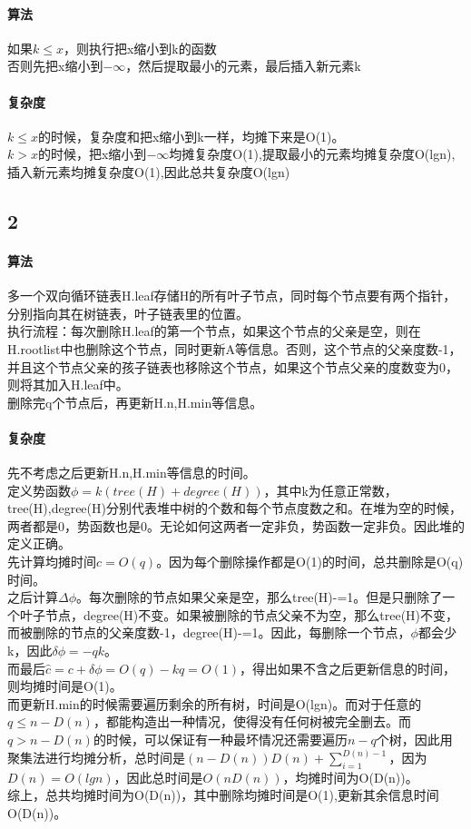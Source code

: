 \documentclass{article}
\begin{document}
\begin{CJK}{UTF8}{gkai}
\paragraph{算法}
如果$k\leq x$，则执行把x缩小到k的函数\\
否则先把x缩小到$-\infty$，然后提取最小的元素，最后插入新元素k\\
\paragraph{复杂度}
$k \leq x$的时候，复杂度和把x缩小到k一样，均摊下来是O(1)。\\
$k > x$的时候，把x缩小到$-\infty$均摊复杂度O(1),提取最小的元素均摊复杂度O(lgn),插入新元素均摊复杂度O(1),因此总共复杂度O(lgn)\\
\subsection{2}
\paragraph{算法}
多一个双向循环链表H.leaf存储H的所有叶子节点，同时每个节点要有两个指针，分别指向其在树链表，叶子链表里的位置。\\
执行流程：每次删除H.leaf的第一个节点，如果这个节点的父亲是空，则在H.rootlist中也删除这个节点，同时更新A等信息。否则，这个节点的父亲度数-1，并且这个节点父亲的孩子链表也移除这个节点，如果这个节点父亲的度数变为0，则将其加入H.leaf中。\\
删除完q个节点后，再更新H.n,H.min等信息。\\
\paragraph{复杂度}
先不考虑之后更新H.n,H.min等信息的时间。\\
定义势函数$\phi=k(tree(H)+degree(H))$，其中k为任意正常数，tree(H),degree(H)分别代表堆中树的个数和每个节点度数之和。在堆为空的时候，两者都是0，势函数也是0。无论如何这两者一定非负，势函数一定非负。因此堆的定义正确。\\
先计算均摊时间$c=O(q)$。因为每个删除操作都是O(1)的时间，总共删除是O(q)时间。\\
之后计算$\Delta \phi$。每次删除的节点如果父亲是空，那么tree(H)-=1。但是只删除了一个叶子节点，degree(H)不变。如果被删除的节点父亲不为空，那么tree(H)不变，而被删除的节点的父亲度数-1，degree(H)-=1。因此，每删除一个节点，$\phi$都会少k，因此$\delta \phi=-qk$。\\
而最后$\hat{c}=c+\delta \phi = O(q)-kq = O(1)$，得出如果不含之后更新信息的时间，则均摊时间是O(1)。\\
而更新H.min的时候需要遍历剩余的所有树，时间是O(lgn)。而对于任意的$q\leq n-D(n)$，都能构造出一种情况，使得没有任何树被完全删去。而$q>n-D(n)$的时候，可以保证有一种最坏情况还需要遍历$n-q$个树，因此用聚集法进行均摊分析，总时间是$(n-D(n))D(n)+\sum_{i=1}^{D(n)-1}$，因为$D(n)=O(lgn)$，因此总时间是$O(nD(n))$，均摊时间为O(D(n))。\\
综上，总共均摊时间为O(D(n))，其中删除均摊时间是O(1),更新其余信息时间O(D(n))。
\end{CJK}
\end{document}
